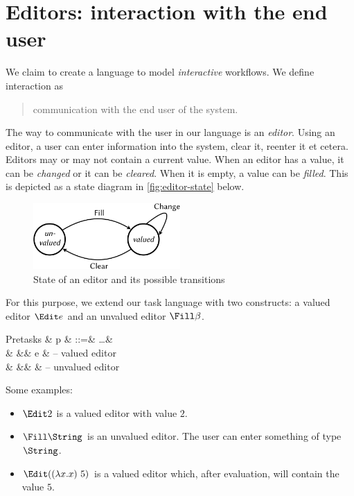 
\section{Editors: interaction with the end user}

We claim to create a language to model \emph{interactive} workflows.
We define interaction as
\begin{quote}
  communication with the end user of the system.
\end{quote}
The way to communicate with the user in our language is an \emph{editor}.
Using an editor,
a user can enter information into the system,
clear it, reenter it et cetera.
Editors may or may not contain a current value.
When an editor has a value, it can be \emph{changed} or it can be \emph{cleared}.
When it is empty, a value can be \emph{filled}.
This is depicted as a state diagram in \autoref{fig:editor-state} below.

\begin{figure}
  \centering
  \includegraphics[width=0.5\textwidth]{figures/editor-state-crop.pdf}
  \caption{State of an editor and its possible transitions}
  \label{fig:editor-state}
\end{figure}

For this purpose, we extend our task language with two constructs:
a valued editor $\Edit e$ and an unvalued editor $\Fill \beta$.
\begin{grammar}
  Pretasks
    & p & ::=& \ldots      & \\
    &   &\mid& \Edit e     & – valued editor \\
    &   &\mid& \Fill \tau  & – unvalued editor \\
\end{grammar}
Some examples:
\begin{itemize}
  \item $\Edit 2$ is a valued editor with value $2$.
  \item $\Fill \String$ is an unvalued editor.
    The user can enter something of type $\String$.
  \item $\Edit ((\lambda x . x)\ 5)$ is a valued editor which,
    after evaluation, will contain the value $5$.
\end{itemize}

